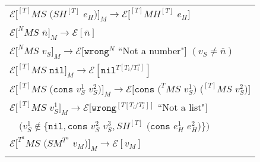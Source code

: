 \begin{figure}[p]
\centering
\begin{tabular}{l}
\vspace{5pt}

$\mathscr{E}[^{[T]}MS$ $(SH^{[T]}$ $e_{H})]_{M}\rightarrow\mathscr{E}[^{[T]}MH^{[T]}$ $e_{H}]$ \\

\vspace{5pt}

$\mathscr{E}[^{N}MS$ $\overline{n}]_{M}\rightarrow\mathscr{E}[\overline{n}]$ \\

\vspace{5pt}

$\mathscr{E}[^{N}MS$ $v_{S}]_{M}\rightarrow\mathscr{E}[\mathtt{wrong}^{N}$ ``Not a number"$]$ $(v_{S}\neq\overline{n})$ \\

\vspace{5pt}

$\mathscr{E}[^{[T]}MS$ $\mathtt{nil}]_{M}\rightarrow\mathscr{E}[\mathtt{nil}^{T[T_{i}/T_{i}^{a}]}]$ \\

\vspace{5pt}

$\mathscr{E}[^{[T]}MS$ $(\mathtt{cons}$ $v_{S}^{1}$ $v_{S}^{2})]_{M}\rightarrow\mathscr{E}[\mathtt{cons}$ $(^{T}MS$ $v_{S}^{1})$ $(^{[T]}MS$ $v_{S}^{2})]$ \\

\vspace{5pt}

$\mathscr{E}[^{[T]}MS$ $v_{S}^{1}]_{M}\rightarrow\mathscr{E}[\mathtt{wrong}^{[T[T_{i}/T_{i}^{a}]]}$ ``Not a list"$]$ \\

\vspace{5pt}

$\quad(v_{S}^{1}\not\in\lbrace\mathtt{nil},\mathtt{cons}$ $v_{S}^{2}$ $v_{S}^{3},SH^{[T]}$ $(\mathtt{cons}$ $e_{H}^{1}$ $e_{H}^{2})\rbrace)$ \\

\vspace{5pt}

$\mathscr{E}[^{T^{a}}MS$ $(SM^{T^{a}}$ $v_{M})]_{M}\rightarrow\mathscr{E}[v_{M}]$ \\

\vspace{5pt}


\end{tabular}
\end{figure}
